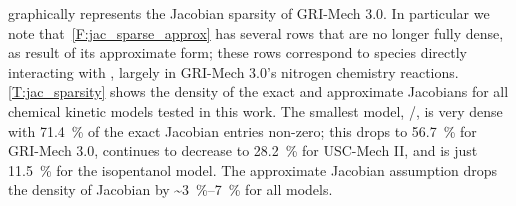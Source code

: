 \documentclass[12pt,number,sort&compress,preprint]{elsarticle}
\begin{document}
 graphically represents the Jacobian sparsity of GRI-Mech 3.0.
In particular we note that~\cref{F:jac_sparse_approx} has several rows that are no longer fully dense, as result of its approximate form; these rows correspond to species directly interacting with , largely in GRI-Mech 3.0's nitrogen chemistry reactions.
\cref{T:jac_sparsity} shows the density of the exact and approximate Jacobians for all chemical kinetic models tested in this work.
The smallest model, \slash{}, is very dense with \SI{71.4}{\percent} of the exact Jacobian entries non-zero; this drops to \SI{56.7}{\percent} for GRI-Mech 3.0, continues to decrease to \SI{28.2}{\percent} for USC-Mech II, and is just \SI{11.5}{\percent} for the isopentanol model.
The approximate Jacobian assumption drops the density of Jacobian by \textasciitilde\SIrange{3}{7}{\percent} for all models.
\end{document}
